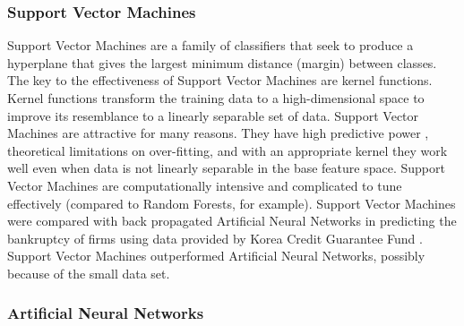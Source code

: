 \documentclass[../thesis/thesis.tex]{subfiles}
\begin{document}
\subsubsection{Support Vector Machines}

Support Vector Machines are a family of classifiers that seek to produce a hyperplane that gives the largest minimum distance (margin) between classes. The key to the effectiveness of Support Vector Machines are kernel functions. Kernel functions transform the training data to a high-dimensional space to improve its resemblance to a linearly separable set of data. Support Vector Machines are attractive for many reasons. They have high predictive power \cite{caruana2006}, theoretical limitations on over-fitting, and with an appropriate kernel they work well even when data is not linearly separable in the base feature space. Support Vector Machines are computationally intensive and complicated to tune effectively (compared to Random Forests, for example). Support Vector Machines were compared with back propagated Artificial Neural Networks in predicting the bankruptcy of firms using data provided by Korea Credit Guarantee Fund \cite{shin2005}. Support Vector Machines outperformed Artificial Neural Networks, possibly because of the small data set.

\subsubsection{Artificial Neural Networks}
\end{document}
